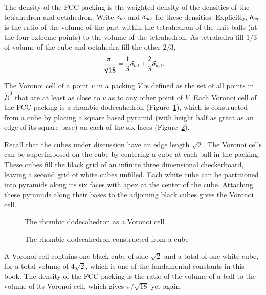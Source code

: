The density of the FCC packing is the weighted density
of the densities of the tetrahedron and octahedron.  Write $\delta_{tet}$ and
$\delta_{oct}$ for these densities.  Explicitly, $\delta_{tet}$ is the ratio of the
volume of the part within the tetrahedron of the unit balls (at the
four extreme points) to the volume of the tetrahedron.  As tetrahedra fill
$1/3$ of volume of the cube and octahedra fill
the other $2/3$,
\begin{displaymath}
  \frac{\pi}{\sqrt{18}} = \frac{1}{3}\delta_{tet} + \frac{2}{3}\delta_{oct}.
\end{displaymath}

The Voronoi cell of a point $v$ in a packing $V$ is defined as the set of all
points in $\ring{R}^3$ 
that are at least as close to $v$ as to any other point
of $V$.  Each Voronoi cell of the FCC packing is a
rhombic dodecahedron (Figure~\ref{fig:rhombic}),  %
which is constructed from a cube by placing a
square based pyramid (with height half as great as an edge of its
square base) on each of the six faces
(Figure~\ref{fig:rhombic-cube}).  %

Recall that the cubes under discussion  have an edge length
$\sqrt{2}$.
The Voronoi cells can be superimposed on the cube by
centering a cube at each ball in the packing. These
cubes fill the black grid of an infinite three dimensional
checkerboard, leaving a second grid of white cubes unfilled.  Each
white cube can be partitioned into pyramids along its six faces with apex
at the center of the cube.  Attaching these pyramids along their bases
to the adjoining black cubes gives the Voronoi cell.

\begin{figure}[htb]
  \centering
  \caption{The rhombic dodecahedron as a Voronoi cell}
  \label{fig:rhombic}
\end{figure}

\begin{figure}[htb]
  \centering
  \caption{The rhombic dodecahedron constructed from a cube}
  \label{fig:rhombic-cube}
\end{figure}

A Voronoi cell contains one black cube of side $\sqrt2$ and a total
of one white cube, for a total volume of $4\sqrt2$, which is
one of the fundamental constants in this book.  The density of the
FCC packing is the ratio of the volume of a ball to the volume
of its Voronoi cell, which gives $\pi/\sqrt{18}$ yet again.





